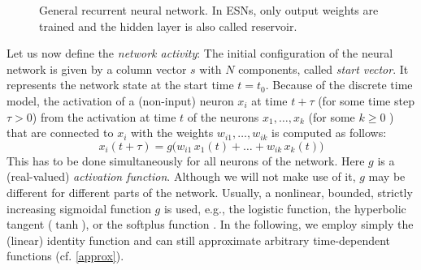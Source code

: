 \documentclass[twoside,11pt]{article}
\theoremstyle{definition}
\begin{document}
\begin{figure}
  \centering
  
  \caption{General recurrent neural network. In ESNs, only output weights are
	trained and the hidden layer is also called reservoir.}
  \label{net}
\end{figure}

Let us now define the \emph{network activity}: The initial
configuration of the neural network is given by a column vector $s$ with $N$
components, called \emph{start vector}. It represents the network state at the
start time $t=t_0$. Because of the discrete time model, the activation
of a (non-input) neuron $x_i$ at time $t+\tau$ (for some time step $\tau>0$) from
the activation at time $t$ of the neurons $x_1,\dots,x_k$ (for some $k \ge 0$ ) that
are connected to $x_i$ with the weights $w_{i1},\dots,w_{ik}$ is computed as
follows:
\begin{equation}\label{recur}
	x_i(t+\tau) = g\big(w_{i1}\,x_1(t) +\dots+ w_{ik}\,x_k(t)\big)
\end{equation}
This has to be done simultaneously for all neurons of the network. Here $g$ is a
(real-valued) \emph{activation function}. Although we will not make use of it,
$g$ may be different for different parts of the network.
Usually, a nonlinear, bounded, strictly increasing sigmoidal function $g$ is
used, e.g., the logistic function, the hyperbolic tangent ($\tanh$), or the
softplus function \citep[Sect.~3.10]{GBC16}. In the following, we employ simply
the (linear) identity function and can still approximate arbitrary
time-dependent functions (cf. \cref{approx}).
\end{document}
